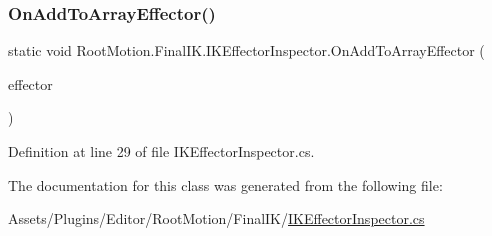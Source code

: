 \subsubsection{\texorpdfstring{On\+Add\+To\+Array\+Effector()}{OnAddToArrayEffector()}}
{\footnotesize\ttfamily static void Root\+Motion.\+Final\+I\+K.\+I\+K\+Effector\+Inspector.\+On\+Add\+To\+Array\+Effector (\begin{DoxyParamCaption}\item[{Serialized\+Property}]{effector }\end{DoxyParamCaption})\hspace{0.3cm}{\ttfamily [static]}}



Definition at line 29 of file I\+K\+Effector\+Inspector.\+cs.



The documentation for this class was generated from the following file\+:\begin{DoxyCompactItemize}
\item 
Assets/\+Plugins/\+Editor/\+Root\+Motion/\+Final\+I\+K/\mbox{\hyperlink{_i_k_effector_inspector_8cs}{I\+K\+Effector\+Inspector.\+cs}}\end{DoxyCompactItemize}
